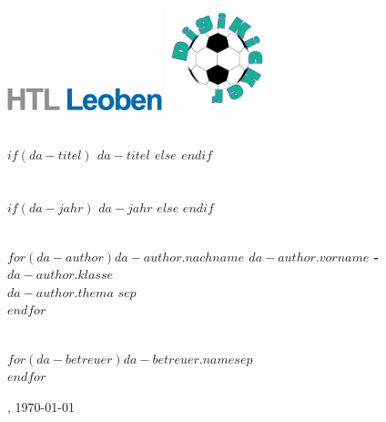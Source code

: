 \documentclass[
    headings=optiontotocandhead,%
    twoside,
    numbers=noenddot,%
    12pt, %
    titlepage, %
    parskip=full, %
    listof=leveldown, 
    numbers=noenddot, %
    a4paper,DIV=14,
    BCOR=15mm,
]{scrbook}
\begin{document}
\frontmatter %
\title{}
\begin{titlepage}

\begin{center}

\includegraphics[width=45mm]{style/HTLLE-Logo.png}
\includegraphics[width=30mm]{style/DigiKickerLogo.png}

\vspace{2cm}
\textbf{\LARGE{}}{\large{}}\\
{\large{}\vspace{15mm}
 \textbf{\large{}
$if(da-titel)$
$da-titel$
$else$
$endif$
}\\

 \vspace{15mm}
  \\
  \\
 \vspace{1cm}
$if(da-jahr)$
$da-jahr$
$else$
$endif$
\\
 \vspace{1cm}
 \\
 \vspace{0.5cm}
}

$for(da-author)$\textbf{$da-author.nachname$ $da-author.vorname$ - $da-author.klasse$} \\ 
$da-author.thema$
\vspace{5mm}
$sep$\\ $endfor$

\par\end{center}{\large \par}

\begin{center}
 \normalsize {} \\
 \vspace{0.5cm}
$for(da-betreuer)$$da-betreuer.name$$sep$\\ $endfor$

\par\end{center}

\begin{center}
\vspace{5mm}
, \today 
\par\end{center}
\end{titlepage}
\end{document}
